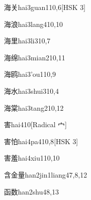\begin{entry}{海关}{hai3guan1}{10,6}[HSK 3]
\end{entry}

\begin{entry}{海浪}{hai3lang4}{10,10}
\end{entry}

\begin{entry}{海里}{hai3li3}{10,7}
\end{entry}

\begin{entry}{海绵}{hai3mian2}{10,11}
\end{entry}

\begin{entry}{海鸥}{hai3'ou1}{10,9}
\end{entry}

\begin{entry}{海水}{hai3shui3}{10,4}
\end{entry}

\begin{entry}{海棠}{hai3tang2}{10,12}
\end{entry}

\begin{entry}{害}{hai4}{10}[Radical 宀]
\end{entry}

\begin{entry}{害怕}{hai4pa4}{10,8}[HSK 3]
\end{entry}

\begin{entry}{害羞}{hai4xiu1}{10,10}
\end{entry}

\begin{entry}{含金量}{han2jin1liang4}{7,8,12}
\end{entry}

\begin{entry}{函数}{han2shu4}{8,13}
\end{entry}


